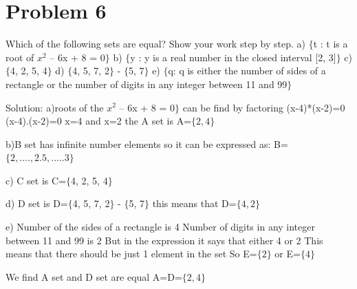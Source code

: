 \documentclass{article}
\begin{document}
   
   
   \section{Problem 6}
   
   Which of the following sets are equal? Show your work step by step.\newline
a) $\{$t : t is a root of $x^2$ – 6x + 8 = 0$\}$
\newline
b) $\{$y : y is a real number in the closed interval [2, 3]$\}$
\newline
c) $\{$4, 2, 5, 4$\}$
\newline
d) $\{$4, 5, 7, 2$\}$ - $\{$5, 7$\}$
\newline
e) $\{$q: q is either the number of sides of a rectangle or the number of digits in any integer between 11 and 99$\}$\\ \newline

Solution:
a)roots of the $x^2$ – 6x + 8 = 0$\}$ can be find by factoring\newline
(x-4)*(x-2)=0 \newline
(x-4).(x-2)=0\newline
x=4 and x=2 the A set is\newline
A=$\{2,4\}$\newline\newline

b)B set has infinite number elements so it can be expressed as:\newline
B=$\{2,....,2.5,.....3\}$\newline

c) C set is C=$\{$4, 2, 5, 4$\}$\newline

d) D set is D=$\{$4, 5, 7, 2$\}$ - $\{$5, 7$\}$ this means that \newline
D=$\{4,2\}$ \newline

e) Number of the sides of a rectangle is 4 \newline
Number of digits in any integer between 11 and 99 is 2 \newline
But in the expression it says that either 4 or 2 \newline
This means that there should be just 1 element in the set\newline
So E=$\{2\}$ or E=$\{4\}$\newline

We find A set and D set are equal\newline
A=D=$\{2,4\}$\newline\newline\newline
\end{document}
